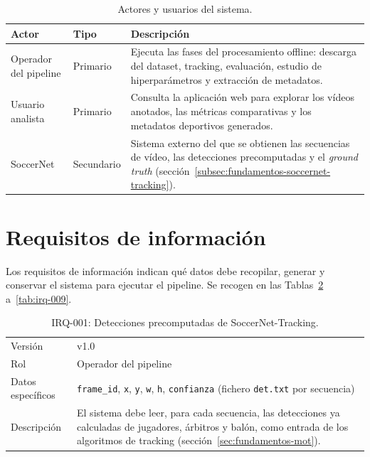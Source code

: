 \begin{table}[htp]
\centering
\caption{Actores y usuarios del sistema.}
\label{tab:analisis-actores}
\renewcommand{\arraystretch}{1.3}
\begin{tabular}{|p{2.7cm}|p{1.7cm}|p{7.9cm}|}
\hline
\rowcolor{gray!25}
\textbf{Actor} & \textbf{Tipo} & \textbf{Descripción} \\
\hline
Operador del pipeline & Primario &
  Ejecuta las fases del procesamiento offline: descarga del dataset,
  tracking, evaluación, estudio de hiperparámetros y extracción de
  metadatos. \\
\hline
Usuario analista & Primario &
  Consulta la aplicación web para explorar los vídeos
  anotados, las métricas comparativas y los metadatos deportivos
  generados. \\
\hline
SoccerNet & Secundario &
  Sistema externo del que se obtienen las secuencias de vídeo, las
  detecciones precomputadas y el \emph{ground truth}
  (sección~\ref{subsec:fundamentos-soccernet-tracking}). \\
\hline
\end{tabular}
\end{table}

\section{Requisitos de información}
\label{sec:analisis-irq}

Los requisitos de información indican qué datos debe recopilar, generar y
conservar el sistema para ejecutar el pipeline. Se recogen en las Tablas~\ref{tab:irq-001}
a~\ref{tab:irq-009}.

\begin{table}[htp]
\centering
\caption{IRQ-001: Detecciones precomputadas de SoccerNet-Tracking.}
\label{tab:irq-001}
\renewcommand{\arraystretch}{1.2}
\begin{tabular}{|p{3.1cm}|p{9.2cm}|}
\hline
\rowcolor{gray!25}
\multicolumn{2}{|l|}{\textbf{IRQ-001 -- Detecciones precomputadas de SoccerNet-Tracking}} \\
\hline
Versión & v1.0 \\
\hline
Rol & Operador del pipeline \\
\hline
Datos específicos & \texttt{frame\_id}, \texttt{x}, \texttt{y}, \texttt{w},
  \texttt{h}, \texttt{confianza} (fichero \texttt{det.txt} por secuencia) \\
\hline
Descripción & El sistema debe leer, para cada secuencia, las detecciones ya
  calculadas de jugadores, árbitros y balón, como entrada de los
  algoritmos de tracking (sección~\ref{sec:fundamentos-mot}). \\
\hline
\end{tabular}
\end{table}

